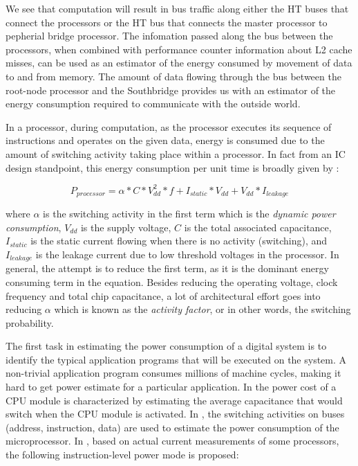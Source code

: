 \documentclass[times, 10pt,onecolumn]{article}
\begin{document}
We see that computation will result in bus traffic along
either the HT buses that connect the processors or the HT bus that
connects the master processor to pepherial bridge processor.  The
infomation passed along the bus between the processors, when combined
with performance counter information about L2 cache misses, can be used
as an estimator of the energy consumed by movement of data to and from
memory.  The amount of data flowing through the bus between the
root-node processor and the Southbridge provides us with an estimator of
the energy consumption required to communicate with the outside world.

In a processor, during computation, as the processor executes
its sequence of instructions and operates on the given data, energy is
consumed due to the amount of switching activity taking place within a
processor. In fact from an IC design standpoint, this energy consumption
per unit time is broadly given by :

\begin{equation}
\label{eq:power_proc}
P_{processor}=  \alpha*C*V_{dd}^2*f + I_{static}*V_{dd} + V_{dd}*I_{leakage}
\end{equation}

where $\alpha$ is the switching activity in the first term which is the
\emph{dynamic power consumption}, $V_{dd}$ is the supply voltage, $C$ is
the total associated capacitance, $I_{static}$ is the static current
flowing when there is no activity (switching), and $I_{leakage}$ is the
leakage current due to low threshold voltages in the processor. In
general, the attempt is to reduce the first term, as it is the dominant
energy consuming term in the equation. Besides reducing the operating
voltage, clock frequency and total chip capacitance, a lot of
architectural effort goes into reducing $\alpha$ which is known as the
\emph{activity factor}, or in other words, the switching probability.

The first task in estimating the power consumption of a digital system
is to identify the typical application programs that will be executed on
the system. A non-trivial application program consumes millions of
machine cycles, making it hard to get power estimate for a particular
application. In \cite{Sato1995} the power cost of a CPU module is
characterized by estimating the average capacitance that would switch
when the CPU module is activated. In \cite{Su1994} , the switching
activities on buses (address, instruction, data) are used to estimate
the power consumption of the microprocessor. In \cite{Tiwari1994},
based on actual current measurements of some processors, the following
instruction-level power mode is proposed:
\end{document}

